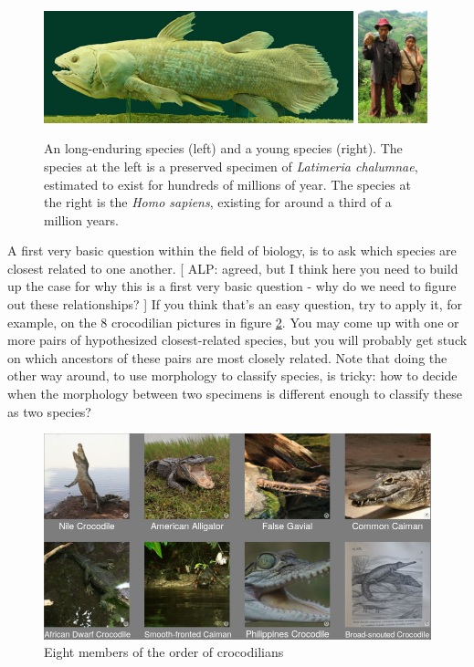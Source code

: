 \begin{figure}[H]
  \includegraphics[width=0.80\textwidth]{latimeria_chalumnae.jpg}
  \includegraphics[width=0.18\textwidth]{homo_sapiens.jpg}
  \caption{
    An long-enduring species (left) and a young species (right).
    The species at the left is a preserved specimen of \textit{Latimeria chalumnae}, 
    estimated to exist for hundreds of millions of year.
    The species at the right is the \textit{Homo sapiens}, 
    existing for around a third of a million years.
  }
  \label{fig:long_enduring_and_young_species}
\end{figure}

A first very basic question within the field of biology,
is to ask which species are closest related to
one another. 
[
  ALP:
  agreed, but I think here you need to build up the case 
  for why this is a first very basic question - 
  why do we need to figure out these relationships?
]
If you think that's an easy question, try to apply it, 
for example, on the 8 crocodilian pictures in figure \ref{fig:crocodialians}.
You may come up with one or more pairs of hypothesized closest-related species,
but you will probably get stuck on which ancestors of these pairs
are most closely related. Note that doing the other way around, to use
morphology to classify species, is tricky: how to decide when the morphology 
between two specimens is different enough to classify these as two species?

\begin{figure}[H]
  \includegraphics[width=1.0\textwidth]{crocodilians.png}
  \caption{
    Eight members of the order of crocodilians
  }
  \label{fig:crocodialians}
\end{figure}

